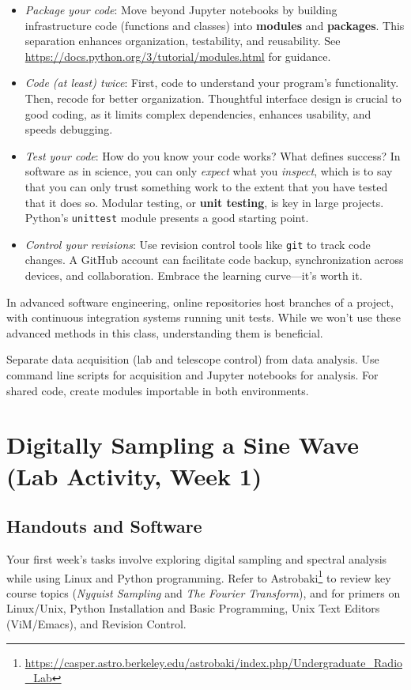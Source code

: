 \documentclass[11pt,preprint]{aastex}
\begin{document}
\begin{itemize}
    \item {\it Package your code}: Move beyond Jupyter notebooks by building infrastructure code (functions and classes) into {\bf modules} and {\bf packages}. This separation enhances organization, testability, and reusability. See \url{https://docs.python.org/3/tutorial/modules.html} for guidance.
    \item {\it Code (at least) twice}: First, code to understand your program's functionality. Then, recode for better organization. Thoughtful interface design is crucial to good coding, as it limits complex dependencies, enhances usability, and speeds debugging.
    \item {\it Test your code}: How do you know your code works? What defines success?  In software as in science, you can only {\it expect} what you {\it inspect}, which is to say that you can only trust something work to the extent that you have tested that it does so.
Modular testing, or {\bf unit testing}, is key in large projects. Python's {\tt unittest} module presents a good starting point.
    \item {\it Control your revisions}: Use revision control tools like {\tt git} to track code changes. A GitHub account can facilitate code backup, synchronization across devices, and collaboration. Embrace the learning curve---it's worth it.
\end{itemize}

\noindent
In advanced software engineering, online repositories host branches of a project, with continuous integration systems running unit tests. While we won't use these advanced methods in this class, understanding them is beneficial.

Separate data acquisition (lab and telescope control) from data analysis. Use command line scripts for acquisition and Jupyter notebooks for analysis. For shared code, create modules importable in both environments.


\section{Digitally Sampling a Sine Wave (Lab Activity, Week 1)}
\label{nyquist}

\subsection{Handouts and Software}

\noindent
Your first week's tasks involve exploring digital sampling and spectral
analysis while using Linux and Python programming. Refer to
Astrobaki\footnote{\url{https://casper.astro.berkeley.edu/astrobaki/index.php/Undergraduate_Radio_Lab}}
to review key course topics ({\it Nyquist Sampling} and {\it The Fourier
Transform}), and for primers on Linux/Unix, Python Installation and Basic
Programming, Unix Text Editors (ViM/Emacs), and Revision Control.
\end{document}

